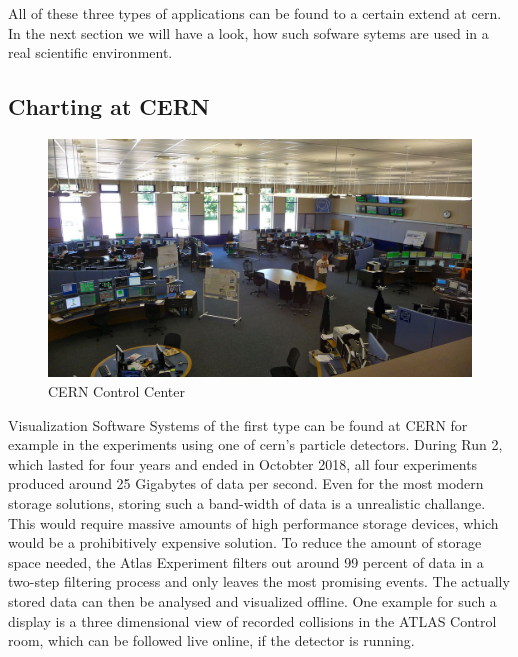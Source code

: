 \cite{VisIdioms}

All of these three types of applications can be found to a certain extend at
\gls{cern}. In the next section we will have a look, how such sofware sytems are
used in a real scientific environment.



\subsection{Charting at CERN}
\label{sec:fundamentals:cerncharting}

\begin{figure}[h]
    \centering
    \includegraphics[width=14cm]{resources/img/CernControlCenter}
    \caption{CERN Control Center}
    \label{fig:ccc}
\end{figure}

Visualization Software Systems of the first type can be found at CERN for
example in the experiments using one of \gls{cern}'s particle detectors. During
Run 2, which lasted for four years and ended in Octobter 2018, all four
experiments produced around 25 Gigabytes of data per second. Even for the most
modern storage solutions, storing such a band-width of data is a unrealistic
challange. This would require massive amounts of high performance storage
devices, which would be a prohibitively expensive solution. To reduce the amount
of storage space needed, the Atlas Experiment filters out around 99 percent of
data in a two-step filtering process and only leaves the most promising events.
The actually stored data can then be analysed and visualized offline. One
example for such a display is a three dimensional view of recorded collisions in
the ATLAS Control room, which can be followed live online, if the detector is
running.

